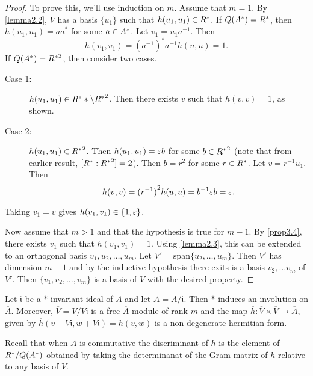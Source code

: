 \begin{proof}
To prove this, we'll use induction on $m$.
Assume that $m = 1$. By \cref{lemma2.2}, $V$ has a basis $\{u_1\}$ such that $h(u_1, u_1) \in R^*$.
If $Q(A^*) = R^*$, then $h(u_1, u_1) = a a^*$ for some $a \in A^*$.
Let $v_1 = u_1 a^{-1}$.
Then
\[
h(v_1, v_1) = (a^{-1})^* a^{-1} h(u, u) = 1.
\]
If $Q(A^*) = {R^*}^2$, then consider two cases.
\begin{description}
\item[Case 1:] $h(u_1, u_1) \in R^** \backslash {R^*}^2$.
Then there exists $v$ such that $h(v,v) = 1$, as shown.
\item[Case 2:] $h(u_1, u_1) \in {R^*}^2$.
Then $h(u_1, u_1) = \varepsilon b$ for some $b \in {R^*}^2$ (note that from earlier result, $[R^* : {R^*}^2] = 2$).
Then $b = r^2$ for some $r \in R^*$.
Let $v = r^{-1} u_1$. Then
\[
h(v, v) = {(r^{-1})}^2 h(u, u) = b^{-1} \varepsilon b = \varepsilon.
\]
\end{description}
Taking $v_1 = v$ gives $h(v_1, v_1) \in \{1, \varepsilon\}$.

Now assume that $m > 1$ and that the hypothesis is true for $m - 1$.
By \cref{prop3.4}, there exists $v_1$ such that $h(v_1, v_1) = 1$.
Using \cref{lemma2.3}, this can be extended to an orthogonal basis $v_1, u_2, \dotsc, u_m$.
Let $V' = \text{span} \{u_2, \dotsc, u_m \}$.
Then $V'$ has dimension $m - 1$ and by the inductive hypothesis there exits is a basis $v_2, \dotsc v_m$ of $V'$.
Then $\{v_1, v_2, \dotsc, v_m \}$ is a basis of $V$ with the desired property.
\end{proof}

Let $\mathfrak{i}$ be a $*$ invariant ideal of $A$ and let $\overline{A} = A / \mathfrak{i}$.
Then $*$ induces an involution on $\overline{A}$.
Moreover, $\overline{V} = V / V \mathfrak{i}$ is a free $\overline{A}$ module of rank $m$ and the map $\overline{h}: \overline{V} \times \overline{V} \to \overline{A}$,
given by $\overline{h}(v + V \mathfrak{i}, w + V \mathfrak{i}) = h(v, w)$ is a non-degenerate hermitian form.

Recall that when $A$ is commutative the discriminant of $h$ is the element of $R^* / Q(A^*)$ obtained by taking the determinanat of the Gram matrix of $h$ relative to any basis of $V$.

